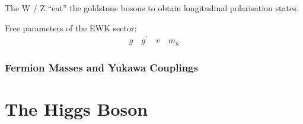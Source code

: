 The W / Z ``eat'' the goldstone bosons to obtain longitudinal polarisation
states.


Free parameters of the EWK sector:
\begin{align*}
  g \quad g^\prime \quad v \quad m_h
\end{align*}





\subsubsection{Fermion Masses and Yukawa Couplings}




\section{The Higgs Boson}


\clearpage

